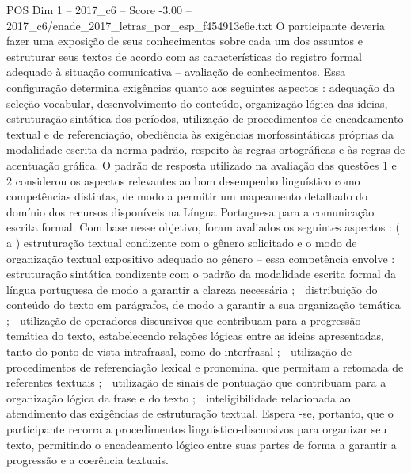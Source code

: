 \begin{textsample}{POS Dim 1 – 2017\_c6 – Score -3.00 – 2017\_c6/enade\_2017\_letras\_por\_esp\_f454913e6e.txt}
O participante deveria fazer uma exposição de seus conhecimentos sobre cada um dos assuntos e estruturar seus textos de acordo com as características do registro formal adequado à situação comunicativa – avaliação de conhecimentos.
Essa configuração determina exigências quanto aos seguintes aspectos : adequação da seleção vocabular, desenvolvimento do conteúdo, organização lógica das ideias, estruturação sintática dos períodos, utilização de procedimentos de encadeamento textual e de referenciação, obediência às exigências morfossintáticas próprias da modalidade escrita da norma-padrão, respeito às regras ortográficas e às regras de acentuação gráfica.
O padrão de resposta utilizado na avaliação das questões 1 e 2 considerou os aspectos relevantes ao bom desempenho linguístico como competências distintas, de modo a permitir um mapeamento detalhado do domínio dos recursos disponíveis na Língua Portuguesa para a comunicação escrita formal.
Com base nesse objetivo, foram avaliados os seguintes aspectos : ( a ) estruturação textual condizente com o gênero solicitado e o modo de organização textual expositivo adequado ao gênero – essa competência envolve :  estruturação sintática condizente com o padrão da modalidade escrita formal da língua portuguesa de modo a garantir a clareza necessária ;  distribuição do conteúdo do texto em parágrafos, de modo a garantir a sua organização temática ;  utilização de operadores discursivos que contribuam para a progressão temática do texto, estabelecendo relações lógicas entre as ideias apresentadas, tanto do ponto de vista intrafrasal, como do interfrasal ;  utilização de procedimentos de referenciação lexical e pronominal que permitam a retomada de referentes textuais ;  utilização de sinais de pontuação que contribuam para a organização lógica da frase e do texto ;  inteligibilidade relacionada ao atendimento das exigências de estruturação textual.
Espera -se, portanto, que o participante recorra a procedimentos linguístico-discursivos para organizar seu texto, permitindo o encadeamento lógico entre suas partes de forma a garantir a progressão e a coerência textuais.

\end{textsample}
